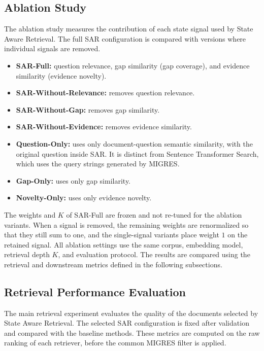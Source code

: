 \documentclass[12pt,a4paper]{report}
\begin{document}
\subsection{Ablation Study}

The ablation study measures the contribution of each state signal used
by State Aware Retrieval. The full SAR configuration is compared with
versions where individual signals are removed.

\begin{itemize}[leftmargin=0.25in,itemsep=0.06in,parsep=0pt]
\item \textbf{SAR-Full:} question relevance, gap similarity (gap coverage), and evidence similarity (evidence novelty).
\item \textbf{SAR-Without-Relevance:} removes question relevance.
\item \textbf{SAR-Without-Gap:} removes gap similarity.
\item \textbf{SAR-Without-Evidence:} removes evidence similarity.
\item \textbf{Question-Only:} uses only document-question semantic similarity, with the original question inside SAR. It is distinct from Sentence Transformer Search, which uses the query strings generated by MIGRES.
\item \textbf{Gap-Only:} uses only gap similarity.
\item \textbf{Novelty-Only:} uses only evidence novelty.
\end{itemize}

The weights and $K$ of SAR-Full are frozen and not re-tuned for the ablation variants. When a signal is removed, the remaining weights are renormalized so that they still sum to one, and the single-signal variants place weight $1$ on the retained signal. All ablation settings use the same corpus, embedding model, retrieval depth $K$, and evaluation protocol. The results are compared using the retrieval and downstream metrics defined in the following subsections.

\subsection{Retrieval Performance Evaluation}

The main retrieval experiment evaluates the quality of the documents
selected by State Aware Retrieval. The selected SAR configuration is
fixed after validation and compared with the baseline methods. These metrics are computed on the raw ranking of each retriever, before the common MIGRES filter is applied.
\end{document}
